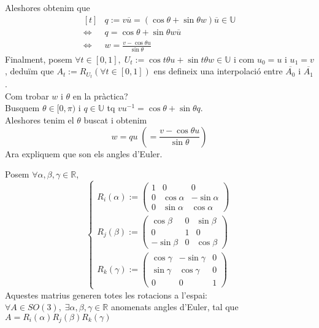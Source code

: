 \documentclass[../main.tex]{subfiles}
\begin{document}
	Aleshores obtenim que
	\begin{displaymath}
		\begin{aligned}[t]
			&q := v\overline{u} = (\cos{\theta} + \sin{\theta}w)\overline{u} \in \mathbb{U}\\
			\iff & q = \cos{\theta} + \sin{\theta}w\overline{u}\\
			\iff & w = \frac{v - \cos{\theta}u}{\sin{\theta}}
		\end{aligned}
	\end{displaymath}
	Finalment, posem $\forall t \in [0,1],\;U_t := \cos{t\theta}u + \sin{t\theta}w \in \mathbb{U}$ i com $u_0 = u$ i $u_1 = v$, deduïm que $A_t := R_{U_t} (\forall t \in [0,1])$ ens defineix una interpolació entre $\overline{A_0}$ i $\overline{A_1}$.\\
	Com trobar $w$ i $\theta$ en la pràctica?\\
	Busquem $\theta \in [0, \pi)$ i $q \in \mathbb{U}$ tq $vu^{-1} = \cos{\theta} + \sin{\theta}q$.\\
	Aleshores tenim el $\theta$ buscat i obtenim
	\begin{displaymath}
		w = qu\;(= \frac{v - \cos{\theta}u}{\sin{\theta}})
	\end{displaymath}
	Ara expliquem que son els angles d'Euler.\\
	\begin{teorema}
		Posem $\forall \alpha, \beta, \gamma \in \mathbb{R}$,
		\begin{displaymath}
			\begin{cases}
				R_{i}(\alpha) :=\begin{pmatrix}
					1 & 0 & 0\\
					0 & \cos{\alpha} & -\sin{\alpha}\\
					0 & \sin{\alpha} & \cos{\alpha}
				\end{pmatrix}\\
				R_{j}(\beta) :=\begin{pmatrix}
					\cos{\beta} & 0 & \sin{\beta}\\
					0 & 1 & 0\\
					-\sin{\beta} & 0 & \cos{\beta}
				\end{pmatrix}\\
				R_{k}(\gamma) :=\begin{pmatrix}
					\cos{\gamma} & -\sin{\gamma} & 0\\
					\sin{\gamma} & \cos{\gamma} & 0\\
					0 & 0 & 1
				\end{pmatrix}
			\end{cases}
		\end{displaymath}
		Aquestes matrius generen totes les rotacions a l'espai:\\
		$\forall A \in SO(3),\; \exists \alpha, \beta, \gamma \in \mathbb{R}$
		anomenats angles d'Euler, tal que\\
		$A = R_{i}(\alpha)R_{j}(\beta)R_{k}(\gamma)$
	\end{teorema}
\end{document}
